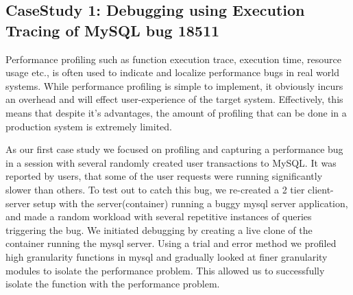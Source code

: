 
\iffalse
\subsection{CaseStudy 1: Debugging using Execution Tracing of MySQL bug 18511}  
Performance profiling such as function execution trace, execution time, resource usage etc., is often used to indicate and localize performance bugs in real world systems. 
While performance profiling is simple to implement, it obviously incurs an overhead and will effect user-experience of the target system.
Effectively, this means that despite it's advantages, the amount of profiling that can be done in a production system is extremely limited. 

As our first case study we focused on profiling and capturing a performance bug in a session with several randomly created user transactions to MySQL. 
It was reported by users, that some of the user requests were running significantly slower than others.
To test out \parikshan to catch this bug, we re-created a 2 tier client-server setup with the server(container) running a buggy mysql server application, and made a random workload with several repetitive instances of queries triggering the bug.
We initiated debugging by creating a live clone of the container running the mysql server.
Using a trial and error method we profiled high granularity functions in mysql and gradually looked at finer granularity modules to isolate the performance problem.
This allowed us to successfully isolate the function with the performance problem.

